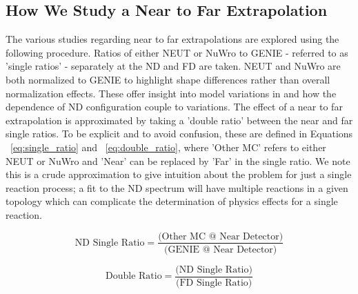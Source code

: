 \documentclass[12pt]{article}
\begin{document}
\subsection{How We Study a Near to Far Extrapolation}
\label{subsec:ntf}
The various studies regarding near to far extrapolations are explored using the following procedure. Ratios of either NEUT or NuWro to GENIE - referred to as 'single ratios' - separately at the ND and FD are taken. NEUT and NuWro are both normalized to GENIE to highlight shape differences rather than overall normalization effects. These offer insight into model variations in and how the dependence of ND configuration couple to variations.
The effect of a near to far extrapolation is approximated by taking a 'double ratio' between the near and far single ratios. To be explicit and to avoid confusion, these are defined in Equations ~\ref{eq:single_ratio} and ~\ref{eq:double_ratio}, where 'Other MC' refers to either NEUT or NuWro and 'Near' can be replaced by 'Far' in the single ratio. We note this is a crude approximation to give intuition about the problem for just a single reaction process; a fit to the ND spectrum will have multiple reactions in a given topology which can complicate the determination of physics effects for a single reaction.

\begin{equation}
\label{eq:single_ratio}
\textrm{ND Single Ratio} = \frac{\textrm{(Other MC @ Near Detector)}}{\textrm{(GENIE @ Near Detector)}}
\end{equation}

\begin{equation}
\label{eq:double_ratio}
\textrm{Double Ratio} = \frac{\textrm{(ND Single Ratio)}}{\textrm{(FD Single Ratio)}}
\end{equation}
\end{document}
